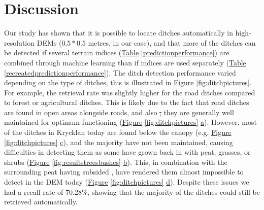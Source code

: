 \documentclass[11pt, review]{elsarticle} %
\providecommand{\DIFaddtex}[1]{{\protect\color{blue}\uwave{#1}}} %
\providecommand{\DIFdeltex}[1]{{\protect\color{red}\sout{#1}}}                      %
\providecommand{\DIFaddbegin}{} %
\providecommand{\DIFaddend}{} %
\providecommand{\DIFdelbegin}{} %
\providecommand{\DIFdelend}{} %
\providecommand{\DIFadd}[1]{\texorpdfstring{\DIFaddtex{#1}}{#1}} %
\providecommand{\DIFdel}[1]{\texorpdfstring{\DIFdeltex{#1}}{}} %
\begin{document}
\section{Discussion}

Our study has shown that it is possible to locate ditches automatically in high-resolution DEMs ($0.5  * 0.5 $ metres, in our case), and that more of the ditches can be detected if several terrain indices (\hyperref[predictionperformance]{Table} \ref{predictionperformance}) are combined through machine learning than if indices are used separately (\hyperref[recreatedpredictionperformance]{Table} \ref{recreatedpredictionperformance}). The ditch detection performance varied depending on the type of ditches, this is illustrated in \hyperref[fig:ditchpictures]{Figure} \ref{fig:ditchpictures}. For example, the retrieval rate was slightly higher for the road ditches compared to forest or agricultural ditches. This is likely due to the fact that  road ditches are found in open areas alongside roads, and also \DIFdelbegin \DIFdel{,   }\DIFdelend \DIFaddbegin \DIFadd{that }\DIFaddend they are generally well maintained for optimum functioning (\hyperref[fig:ditchpictures]{Figure} \ref{fig:ditchpictures} \hyperref[fig:ditchpictures]{a}). However, most of the ditches in Krycklan today are found below the canopy (e.g. \hyperref[fig:ditchpictures]{Figure} \ref{fig:ditchpictures} \hyperref[fig:ditchpictures]{c}), and the majority have not been maintained, causing difficulties in detecting them as some have grown back in with peat, grasses, or shrubs (\hyperref[fig:resultstreesbushes]{Figure} \ref{fig:resultstreesbushes} \hyperref[fig:resultstreesbushes]{b}). This, in combination with the surrounding peat having subsided \citep{heikurainen}, have rendered them almost impossible to detect in the DEM today (\hyperref[fig:ditchpictures]{Figure} \ref{fig:ditchpictures} \hyperref[fig:ditchpictures]{d}). Despite these issues we \DIFdelbegin \DIFdel{had }\DIFdelend \DIFaddbegin \DIFadd{achieved }\DIFaddend a recall rate of 70.28\%, showing that the majority of the ditches could still be retrieved automatically.
\end{document}
